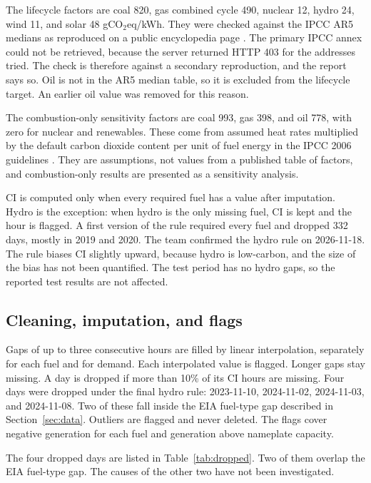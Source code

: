 \documentclass[10pt,journal,compsoc]{IEEEtran}
\begin{document}
The lifecycle factors are coal 820, gas combined cycle 490, nuclear 12, hydro 24, wind 11, and solar 48 gCO$_2$eq/kWh. They were checked against the IPCC AR5 medians as reproduced on a public encyclopedia page \cite{wikilca}. The primary IPCC annex could not be retrieved, because the server returned HTTP 403 for the addresses tried. The check is therefore against a secondary reproduction, and the report says so. Oil is not in the AR5 median table, so it is excluded from the lifecycle target. An earlier oil value was removed for this reason.

The combustion-only sensitivity factors are coal 993, gas 398, and oil 778, with zero for nuclear and renewables. These come from assumed heat rates multiplied by the default carbon dioxide content per unit of fuel energy in the IPCC 2006 guidelines \cite{ipcc2006}. They are assumptions, not values from a published table of factors, and combustion-only results are presented as a sensitivity analysis.

CI is computed only when every required fuel has a value after imputation. Hydro is the exception: when hydro is the only missing fuel, CI is kept and the hour is flagged. A first version of the rule required every fuel and dropped 332 days, mostly in 2019 and 2020. The team confirmed the hydro rule on 2026-11-18. The rule biases CI slightly upward, because hydro is low-carbon, and the size of the bias has not been quantified. The test period has no hydro gaps, so the reported test results are not affected.

\subsection{Cleaning, imputation, and flags}
Gaps of up to three consecutive hours are filled by linear interpolation, separately for each fuel and for demand. Each interpolated value is flagged. Longer gaps stay missing. A day is dropped if more than 10\% of its CI hours are missing. Four days were dropped under the final hydro rule: 2023-11-10, 2024-11-02, 2024-11-03, and 2024-11-08. Two of these fall inside the EIA fuel-type gap described in Section~\ref{sec:data}. Outliers are flagged and never deleted. The flags cover negative generation for each fuel and generation above nameplate capacity.

The four dropped days are listed in Table~\ref{tab:dropped}. Two of them overlap the EIA fuel-type gap. The causes of the other two have not been investigated.
\end{document}
